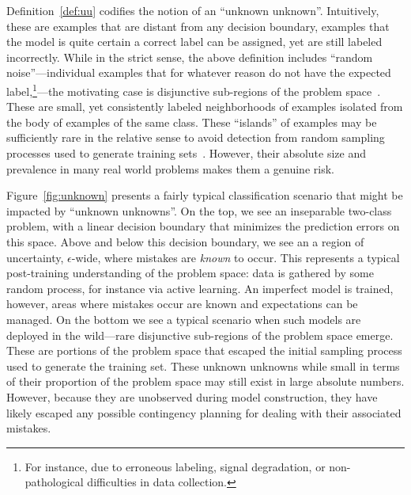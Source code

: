 Definition~\ref{def:uu} codifies the notion of an ``unknown unknown''. Intuitively, these are examples that are distant from any decision boundary, examples that the model is quite certain a correct label can be assigned, yet are still labeled incorrectly.  While in the strict sense, the above definition includes ``random noise''---individual examples that for whatever reason do not have the expected label,\footnote{For instance,  due to erroneous labeling, signal degradation, or non-pathological difficulties in data collection.}---the motivating case is disjunctive sub-regions of the problem space~\cite{weiss10disjunct}. These are small, yet consistently labeled neighborhoods of examples isolated from the body of examples of the same class. These ``islands'' of examples may be sufficiently rare in the relative sense to avoid detection from random sampling processes used to generate training sets~\cite{attenberg:2010inactive, attprov:kdd2010}. However, their absolute size and prevalence in many real world problems makes them a genuine risk.

Figure~\ref{fig:unknown} presents a fairly typical classification
scenario that might be impacted by ``unknown unknowns''. On the top,
we see an inseparable two-class problem, with a linear decision
boundary that minimizes the prediction errors on this space. Above and
below this decision boundary, we see an a region of uncertainty, $\epsilon$-wide,
where mistakes are \emph{known} to occur. This
represents a typical post-training understanding of the problem space: 
data is gathered by some random process, for instance via active
learning. An imperfect model is trained, however, areas where mistakes
occur are known and expectations can be managed. On the bottom we see
a typical scenario when such models are deployed in the wild---rare
disjunctive sub-regions of the problem space emerge.  These are portions of the
problem space that escaped the initial sampling process used to generate
the training set. These unknown unknowns while small in terms of their
proportion of the problem space may still exist in large absolute
numbers.  However, because they are unobserved during model
construction, they have likely escaped any possible contingency
planning for dealing with their associated mistakes.

